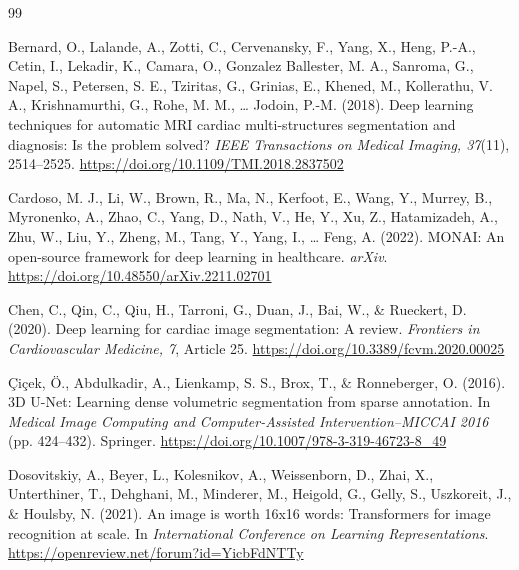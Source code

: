 \begin{thebibliography}{99}
\setlength{\itemsep}{0.45\baselineskip}
\setlength{\parskip}{0pt}

Bernard, O., Lalande, A., Zotti, C., Cervenansky, F., Yang, X., Heng, P.-A., Cetin, I., Lekadir, K., Camara, O., Gonzalez Ballester, M. A., Sanroma, G., Napel, S., Petersen, S. E., Tziritas, G., Grinias, E., Khened, M., Kollerathu, V. A., Krishnamurthi, G., Rohe, M. M., \ldots{} Jodoin, P.-M. (2018). Deep learning techniques for automatic MRI cardiac multi-structures segmentation and diagnosis: Is the problem solved? \textit{IEEE Transactions on Medical Imaging, 37}(11), 2514--2525. \url{https://doi.org/10.1109/TMI.2018.2837502}

Cardoso, M. J., Li, W., Brown, R., Ma, N., Kerfoot, E., Wang, Y., Murrey, B., Myronenko, A., Zhao, C., Yang, D., Nath, V., He, Y., Xu, Z., Hatamizadeh, A., Zhu, W., Liu, Y., Zheng, M., Tang, Y., Yang, I., \ldots{} Feng, A. (2022). MONAI: An open-source framework for deep learning in healthcare. \textit{arXiv}. \url{https://doi.org/10.48550/arXiv.2211.02701}

Chen, C., Qin, C., Qiu, H., Tarroni, G., Duan, J., Bai, W., \& Rueckert, D. (2020). Deep learning for cardiac image segmentation: A review. \textit{Frontiers in Cardiovascular Medicine, 7}, Article 25. \url{https://doi.org/10.3389/fcvm.2020.00025}

{\c{C}}i{\c{c}}ek, {\"O}., Abdulkadir, A., Lienkamp, S. S., Brox, T., \& Ronneberger, O. (2016). 3D U-Net: Learning dense volumetric segmentation from sparse annotation. In \textit{Medical Image Computing and Computer-Assisted Intervention--MICCAI 2016} (pp. 424--432). Springer. \url{https://doi.org/10.1007/978-3-319-46723-8_49}

Dosovitskiy, A., Beyer, L., Kolesnikov, A., Weissenborn, D., Zhai, X., Unterthiner, T., Dehghani, M., Minderer, M., Heigold, G., Gelly, S., Uszkoreit, J., \& Houlsby, N. (2021). An image is worth 16x16 words: Transformers for image recognition at scale. In \textit{International Conference on Learning Representations}. \url{https://openreview.net/forum?id=YicbFdNTTy}


\end{thebibliography}
